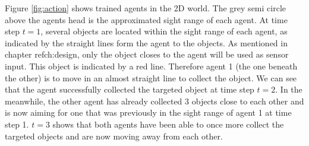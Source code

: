 \documentclass[10pt,a4paper,DIV=11]{scrreprt}
\begin{document}
Figure \ref{fig:action} shows trained agents in the 2D world. The grey semi circle above the agents head is the approximated sight range of each agent.
At time step $t=1$, several objects are located within the sight range of each agent, as indicated by the straight lines form the agent to the objects.
As mentioned in chapter ref{ch:design}, only the object closes to the agent will be used as sensor input. This object is indicated by a red line. Therefore
agent 1 (the one beneath the other) is to move in an almost straight line to collect the object. We can see that the agent successfully collected the targeted
object at time step $t=2$. In the meanwhile, the other agent has already collected 3 objects close to each other and is now aiming for one that was previously 
in the sight range of agent 1 at time step 1. $t=3$ shows that both agents have been able to once more collect the targeted objects and are now moving away 
from each other. 
\end{document}
